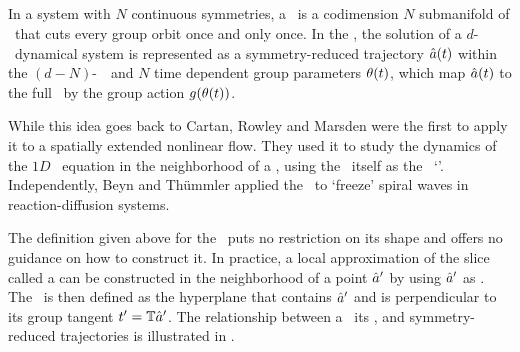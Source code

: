 \subsection{\Mslices}
\label{s-slice}

In a system with $N$ continuous symmetries, a \emph{\slice} \pSRed\ is a codimension $N$ submanifold
of \pS\ that cuts every group orbit once and only once. In the \emph{\mslices}, the solution
of a $d$-\dmn\ dynamical system is represented as a symmetry-reduced trajectory $\hat{a} (t)$ within the
$(d-N)$-\dmn\ \slice\ and $N$ time dependent group parameters $\theta(t)$, which
map $\hat{a} (t)$ to the full \statesp\ by the group action $g(\theta(t))$.

While this idea goes back to Cartan,
Rowley and Marsden
were the first to apply it to a spatially extended nonlinear flow. They used it to study the dynamics of
the $1D$ \KS\ equation in the neighborhood of
a \reqv, using the \reqv\ itself as the \slice\ `\template'.
Independently, Beyn and Th\"{u}mmler applied
the \mslices\ to `freeze' spiral waves in reaction-diffusion systems.

The definition given above for the \slice\ puts no restriction on its shape
and offers no guidance on how to construct it. In practice, a
local approximation of the slice called a \emph{\slicePlane} can be constructed
in the neighborhood of a point ${\hat{a}'}$ by using ${\hat{a}'}$ as
\emph{\template}. The \slicePlane\ is then defined as the hyperplane that
contains ${\hat{a}'}$ and is perpendicular to its group tangent $t'_{}
= \mathbb{T} {\hat{a}'}$. The relationship between a \template\, its \slicePlane, and symmetry-reduced trajectories
is illustrated in .


